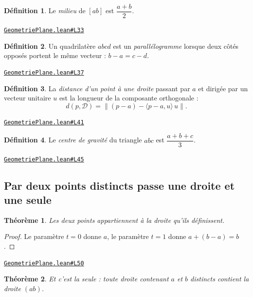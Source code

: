 \documentclass[11pt,a4paper]{article}
\theoremstyle{definition}
\newtheorem{definition}{Définition}
\theoremstyle{plain}
\newtheorem{theoreme}{Théorème}
\newcommand{\source}[2]{\par\smallskip\noindent\hfill{\footnotesize\href{#1}{\texttt{#2}}}\par\smallskip}
\begin{document}
\begin{definition}
Le \emph{milieu} de $[ab]$ est $\dfrac{a + b}{2}$.
\end{definition}
\source{https://github.com/Commutator-IO/learn-lean/blob/main/courses/01-college/02-geometrie-plane/GeometriePlane.lean\#L33}{GeometriePlane.lean\#L33}

\begin{definition}
Un quadrilatère $abcd$ est un \emph{parallélogramme} lorsque deux côtés opposés portent
le même vecteur : $b - a = c - d$.
\end{definition}
\source{https://github.com/Commutator-IO/learn-lean/blob/main/courses/01-college/02-geometrie-plane/GeometriePlane.lean\#L37}{GeometriePlane.lean\#L37}

\begin{definition}
La \emph{distance d'un point à une droite} passant par $a$ et dirigée par un vecteur
unitaire $u$ est la longueur de la composante orthogonale :
\[ d(p, \mathcal{D}) = \bigl\| (p - a) - \langle p - a, u\rangle\, u \bigr\| . \]
\end{definition}
\source{https://github.com/Commutator-IO/learn-lean/blob/main/courses/01-college/02-geometrie-plane/GeometriePlane.lean\#L41}{GeometriePlane.lean\#L41}

\begin{definition}
Le \emph{centre de gravité} du triangle $abc$ est $\dfrac{a + b + c}{3}$.
\end{definition}
\source{https://github.com/Commutator-IO/learn-lean/blob/main/courses/01-college/02-geometrie-plane/GeometriePlane.lean\#L45}{GeometriePlane.lean\#L45}

\subsection{Par deux points distincts passe une droite et une seule}

\begin{theoreme}
Les deux points appartiennent à la droite qu'ils définissent.
\end{theoreme}

\begin{proof}
Le paramètre $t = 0$ donne $a$, le paramètre $t = 1$ donne $a + (b - a) = b$.
\end{proof}
\source{https://github.com/Commutator-IO/learn-lean/blob/main/courses/01-college/02-geometrie-plane/GeometriePlane.lean\#L50}{GeometriePlane.lean\#L50}

\begin{theoreme}
Et c'est la seule : toute droite contenant $a$ et $b$ distincts contient la droite
$(ab)$.
\end{theoreme}
\end{document}
